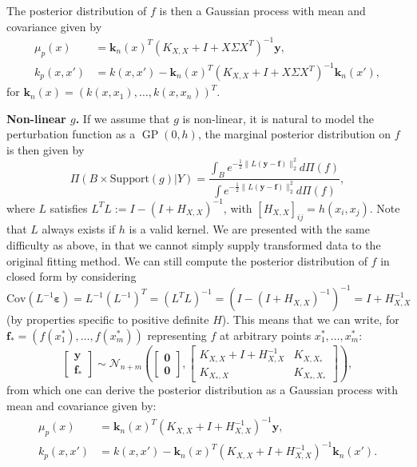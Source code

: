 \documentclass[11pt]{article}
\newcommand{\subparspacenonewline}{\vspace{3mm}}
\newcommand{\eps}{\varepsilon}
\newcommand{\cov}{\textrm{Cov}}
\numberwithin{equation}{section}
\begin{document}
The posterior distribution of $f$ is then a Gaussian process with mean and covariance given by
\begin{align}
	\mu_p(x) &= \mathbf{k}_n(x)^T (K_{X, X} + I + X\Sigma X^T)^{-1}\mathbf{y}, \label{eq:gp_posterior_linear} \\
	k_p(x, x') &= k(x, x') - \mathbf{k}_n(x)^T (K_{X, X} + I + X\Sigma X^T)^{-1} \mathbf{k}_n(x'), \nonumber
\end{align}
for $\mathbf{k}_n(x) = (k(x, x_1), \dots, k(x, x_n))^T$.

\subparspacenonewline
{\bf Non-linear $g$.}
If we assume that $g$ is non-linear, it is natural to model the perturbation function as a $\operatorname{GP}(0, h)$, the marginal posterior distribution on $f$ is then given by
$$
\Pi(B \times \textrm{Support}(g) | Y) = \frac{\int_B e^{-\frac{1}{2}\|L(\mathbf{y} - \mathbf{f})\|_2^2} d\Pi(f)}{\int e^{-\frac{1}{2}\|L(\mathbf{y} - \mathbf{f})\|_2^2} d\Pi(f)},
$$
where $L$ satisfies $L^TL := I - (I+H_{X, X})^{-1}$, with $[H_{X, X}]_{ij} = h(x_i, x_j)$. Note that $L$ always exists if $h$ is a valid kernel. We are presented with the same difficulty as above, in that we cannot simply supply transformed data to the original fitting method. We can still compute the posterior distribution of $f$ in closed form by considering $\cov(L^{-1}\boldsymbol{\eps}) = L^{-1}(L^{-1})^T = (L^T L)^{-1} = (I - (I+H_{X, X})^{-1})^{-1} = I + H_{X, X}^{-1}$ (by properties specific to positive definite $H$). This means that we can write, for $\mathbf{f}_* = (f(x_1^*), \dots, f(x_m^*))$ representing $f$ at arbitrary points $x_1^*, \dots, x_m^*$:
$$
\left[\begin{matrix}
	\mathbf{y} \\ \mathbf{f_*}
\end{matrix} \right]
\sim \mathcal{N}_{n + m} \left( 
\left[\begin{matrix}
\mathbf{0} \\ \mathbf{0}	
\end{matrix} \right]
, 
\left[\begin{matrix}
K_{X, X} + I + H_{X, X}^{-1} & K_{X, X_*} \\ 
K_{X_*, X} & K_{X_*, X_*}
\end{matrix} \right]
 \right),
$$
from which one can derive the posterior distribution as a Gaussian process with mean and covariance given by:
\begin{align}
	\mu_p(x) &= \mathbf{k}_n(x)^T (K_{X, X} + I + H_{X, X}^{-1})^{-1}\mathbf{y}, \label{eq:gp_posterior_nonlinear}\\
	k_p(x, x') &= k(x, x') - \mathbf{k}_n(x)^T (K_{X, X} + I + H_{X, X}^{-1})^{-1} \mathbf{k}_n(x'). \nonumber
\end{align}
\end{document}
